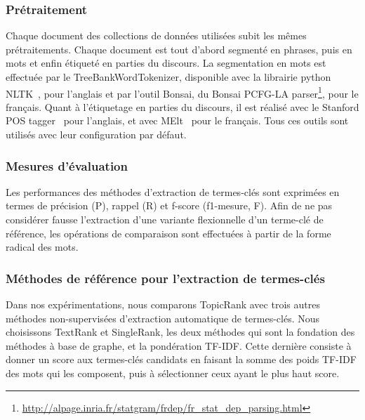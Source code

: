     \subsubsection{Prétraitement}
    \label{subsubsec:pretraitement}
      Chaque document des collections de données utilisées subit les mêmes
      prétraitements. Chaque document est tout d'abord segmenté en phrases, puis
      en mots et enfin étiqueté en parties du discours. La segmentation en mots
      est effectuée par le TreeBankWordTokenizer, disponible avec la librairie
      python NLTK~\cite[\textit{Natural Language ToolKit}]{bird2009nltk}, pour
      l'anglais et par l'outil Bonsai, du Bonsai PCFG-LA
      parser\footnote{\url{http://alpage.inria.fr/statgram/frdep/fr_stat_dep_parsing.html}},
      pour le français. Quant à l'étiquetage en parties du discours, il est
      réalisé avec le Stanford POS tagger~\cite{toutanova2003stanfordpostagger}
      pour l'anglais, et avec MElt~\cite{denis2009melt} pour le français. Tous
      ces outils sont utilisés avec leur configuration par défaut.

    \subsubsection{Mesures d'évaluation}
    \label{subsubsec:mesures_d_evaluation}
      Les performances des méthodes d'extraction de termes-clés sont exprimées
      en termes de précision (P), rappel (R) et f-score (f1-mesure, F). Afin de
      ne pas considérer fausse l'extraction d'une variante flexionnelle d'un
      terme-clé de référence, les opérations de comparaison sont effectuées à
      partir de la forme radical des mots.

    \subsubsection{Méthodes de référence pour l'extraction de termes-clés}
    \label{subsubsec:systemes_de_reference_pour_l_extraction_de_termes_cles}
      Dans nos expérimentations, nous comparons TopicRank avec trois autres
      méthodes non-supervisées d'extraction automatique de termes-clés. Nous
      choisissons TextRank et SingleRank, les deux méthodes qui sont la
      fondation des méthodes à base de graphe, et la pondération TF-IDF. Cette
      dernière consiste à donner un score aux termes-clés candidats en faisant
      la somme des poids TF-IDF des mots qui les composent, puis à sélectionner
      ceux ayant le plus haut score.

